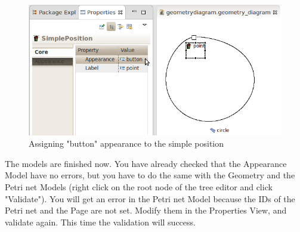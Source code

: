 \begin{figure}[htp]
\begin{center}
  \includegraphics[width=12.0cm]{image/tutorial/Tutorial_16.png}
  \caption{Assigning "button" appearance to the simple position}
  \label{fig:tut16}
\end{center}
\end{figure}

The models are finished now. You have already checked that the Appearance Model have no errors, but you have to do the same with the 
Geometry and the Petri net Models (right click on the root node of the tree editor and click "Validate"). You will get an error in the 
Petri net Model because the IDs of the Petri net and the Page are not set. Modify them in the Properties View, and validate again. 
This time the validation will success.

